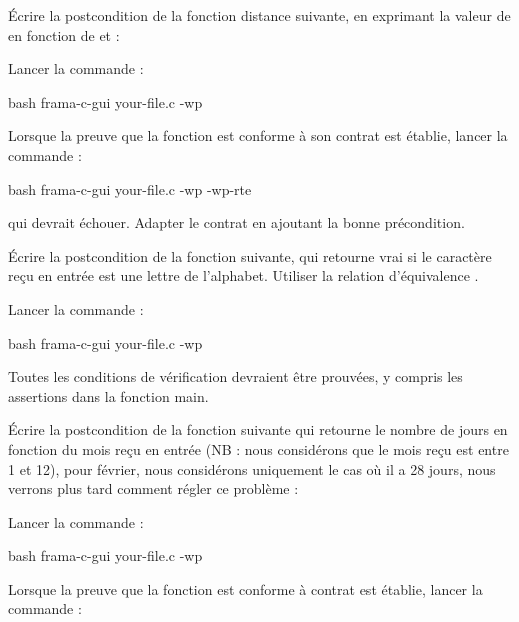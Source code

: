 

Écrire la postcondition de la fonction distance suivante, en exprimant
la valeur de  en fonction de  et
 :




Lancer la commande :


\begin{CodeBlock}{bash}
frama-c-gui your-file.c -wp
\end{CodeBlock}


Lorsque la preuve que la fonction est conforme à son contrat est établie, lancer
la commande :
\begin{CodeBlock}{bash}
frama-c-gui your-file.c -wp -wp-rte
\end{CodeBlock}
qui devrait échouer. Adapter le contrat en ajoutant la bonne précondition.




Écrire la postcondition de la fonction suivante, qui retourne vrai si le
caractère reçu en entrée est une lettre de l'alphabet. Utiliser la relation
d'équivalence  \CodeInline{<==>}.




Lancer la commande :


\begin{CodeBlock}{bash}
frama-c-gui your-file.c -wp
\end{CodeBlock}


Toutes les conditions de vérification devraient être prouvées, y compris les
assertions dans la fonction main.




Écrire la postcondition de la fonction suivante qui retourne le nombre de
jours en fonction du mois reçu en entrée (NB : nous considérons que le mois
reçu est entre 1 et 12), pour février, nous considérons uniquement le cas
où il a 28 jours, nous verrons plus tard comment régler ce problème :




Lancer la commande :


\begin{CodeBlock}{bash}
frama-c-gui your-file.c -wp
\end{CodeBlock}


Lorsque la preuve que la fonction est conforme à contrat est établie, lancer
la commande :

